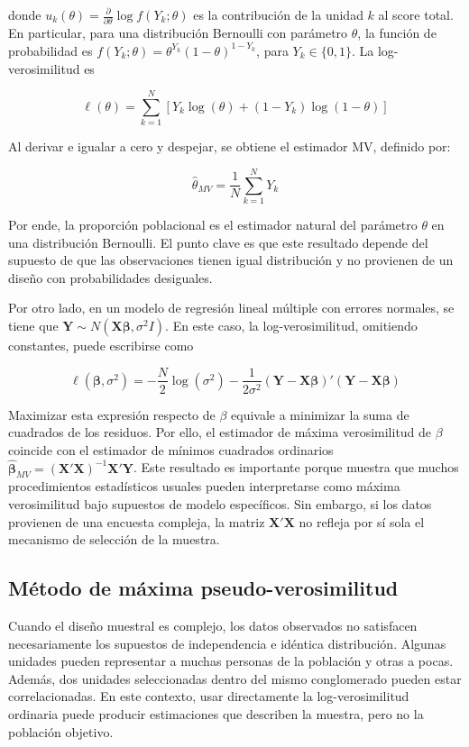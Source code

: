 \documentclass[
  spanish,
  11pt,
  letterpaper,
  oneside,
  open=any]{scrbook}
\begin{document}
donde
\(u_k(\theta) = \frac{\partial}{\partial\theta}\log f(Y_k;\theta)\) es
la contribución de la unidad \(k\) al score total. En particular, para
una distribución Bernoulli con parámetro \(\theta\), la función de
probabilidad es \(f(Y_k;\theta) = \theta^{Y_k}(1-\theta)^{1-Y_k}\), para
\(Y_k \in \{0,1\}\). La log-verosimilitud es

\[
\ell(\theta)
= \sum_{k=1}^{N}
\left[
Y_k\log(\theta)
+(1-Y_k)\log(1-\theta)
\right]
\]

Al derivar e igualar a cero y despejar, se obtiene el estimador MV,
definido por:

\[
\hat{\theta}_{MV}
= \frac{1}{N}\sum_{k=1}^{N}Y_k
\]

Por ende, la proporción poblacional es el estimador natural del
parámetro \(\theta\) en una distribución Bernoulli. El punto clave es
que este resultado depende del supuesto de que las observaciones tienen
igual distribución y no provienen de un diseño con probabilidades
desiguales.

Por otro lado, en un modelo de regresión lineal múltiple con errores
normales, se tiene que
\(\mathbf{Y} \sim N(\mathbf{X}\boldsymbol{\beta},\sigma^2 I)\). En este
caso, la log-verosimilitud, omitiendo constantes, puede escribirse como

\[
\ell(\boldsymbol{\beta},\sigma^2) = -\frac{N}{2}\log(\sigma^2) -\frac{1}{2\sigma^2}(\mathbf{Y}-\mathbf{X}\boldsymbol{\beta})'(\mathbf{Y}-\mathbf{X}\boldsymbol{\beta})
\]

Maximizar esta expresión respecto de \(\beta\) equivale a minimizar la
suma de cuadrados de los residuos. Por ello, el estimador de máxima
verosimilitud de \(\beta\) coincide con el estimador de mínimos
cuadrados ordinarios
\(\hat{\boldsymbol{\beta}}_{MV} = (\mathbf{X}'\mathbf{X})^{-1}\mathbf{X}'\mathbf{Y}\).
Este resultado es importante porque muestra que muchos procedimientos
estadísticos usuales pueden interpretarse como máxima verosimilitud bajo
supuestos de modelo específicos. Sin embargo, si los datos provienen de
una encuesta compleja, la matriz \(\mathbf{X}'\mathbf{X}\) no refleja
por sí sola el mecanismo de selección de la muestra.

\subsection{Método de máxima pseudo-verosimilitud}\label{sec-mpv-formal}

Cuando el diseño muestral es complejo, los datos observados no
satisfacen necesariamente los supuestos de independencia e idéntica
distribución. Algunas unidades pueden representar a muchas personas de
la población y otras a pocas. Además, dos unidades seleccionadas dentro
del mismo conglomerado pueden estar correlacionadas. En este contexto,
usar directamente la log-verosimilitud ordinaria puede producir
estimaciones que describen la muestra, pero no la población objetivo.
\end{document}
